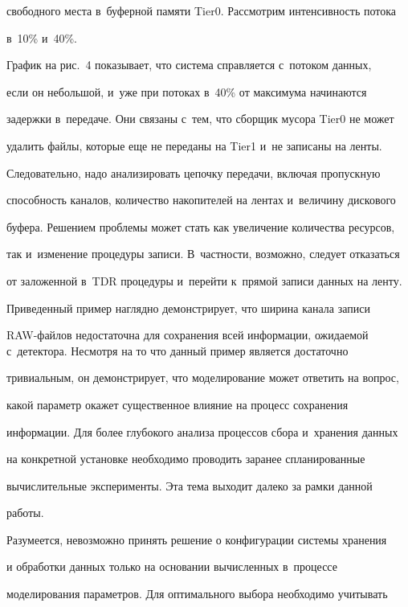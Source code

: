 свободного места в~буферной памяти Tier0. Рассмотрим интенсивность потока


в~10\% и~40\%.





   График на рис.~4 показывает, что система справляется с~потоком данных,


если он небольшой, и~уже при потоках в~40\% от максимума начинаются


задержки в~передаче. Они связаны с~тем, что сборщик мусора Tier0 не может


удалить файлы, которые еще не переданы на Tier1 и~не записаны на ленты.


Следовательно, надо анализировать цепочку передачи, включая пропускную


способность каналов, количество накопителей на лентах и~величину дискового


буфера. Решением проблемы может стать как увеличение количества ресурсов,


так и~изменение процедуры записи. В~частности, возможно, следует отказаться


от заложенной в~TDR процедуры и~перейти к~прямой записи данных на ленту.





  Приведенный пример наглядно демонстрирует, что ширина канала записи


RAW-фай\-лов недостаточна для сохранения всей информации, ожидаемой с~детектора. Несмотря на то что данный пример является достаточно


тривиальным, он демонстрирует, что моделирование может ответить на вопрос,


какой параметр окажет существенное влияние на процесс сохранения


информации. Для более глубокого анализа процессов сбора и~хранения данных


на конкретной установке необходимо проводить заранее спланированные


вычислительные эксперименты. Эта тема выходит далеко за рамки данной


работы.





  Разумеется, невозможно принять решение о конфигурации системы хранения


и обработки данных только на основании вычисленных в~процессе


моделирования параметров. Для оптимального выбора необходимо учитывать


